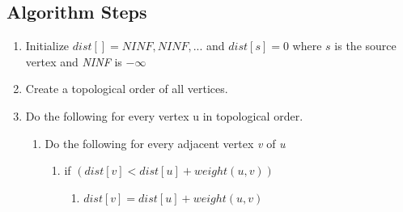 \documentclass[]{article}
\begin{document}
	\subsection{Algorithm Steps}
	\begin{enumerate}
		\item Initialize $dist[] = {NINF, NINF,...}$ and $dist[s] = 0$ where $s$ is the source vertex and \textit{NINF} is $-\infty$
		\item Create a topological order of all vertices.
		\item Do the following for every vertex u in topological order.
		\begin{enumerate}
			\item Do the following for every adjacent vertex \textit{v} of \textit{u}
			\begin{enumerate}
				\item if $(dist[v] < dist[u] + weight(u,v))$
				\begin{enumerate}
					\item $dist[v] = dist[u] + weight(u,v)$
				\end{enumerate}
			\end{enumerate}
		\end{enumerate}
	\end{enumerate}


\newpage
\nocite{*}
\printbibliography
\end{document}
